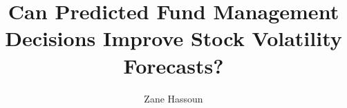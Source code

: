 \documentclass[a4paper,12pt,oneside]{report}
\begin{document}
\title{Can Predicted Fund Management Decisions Improve Stock Volatility Forecasts?}

\author{Zane Hassoun}

\normallinespacing
\maketitle

\preface




\frontpagestyle

\body

\mainpagestyle








\newpage
\frontpagestyle

\renewcommand\bibname{Bibliography}




    \renewcommand{\listfigurename}{Selected Figures}
    
    

    \cleardoublepage
    \listoffigures
    \pagestyle{plain}
    

\end{document}
